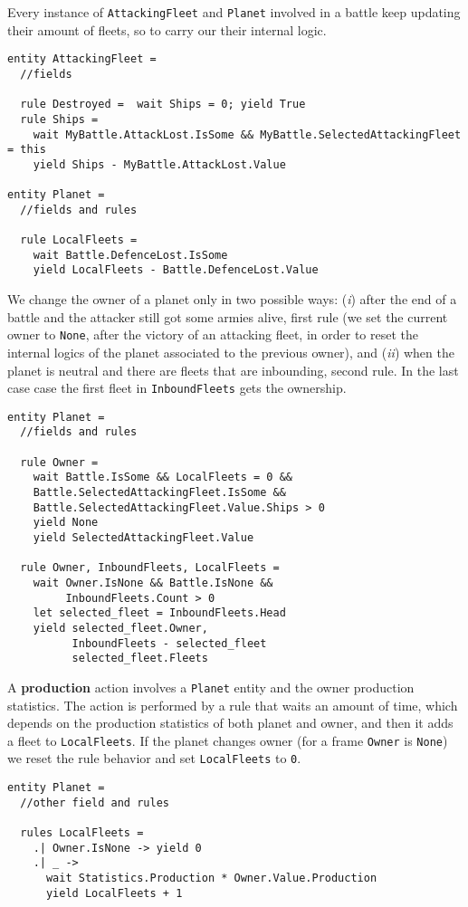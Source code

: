 \noindent
Every instance of \texttt{AttackingFleet} and \texttt{Planet} involved in a battle keep updating their amount of fleets, so to carry our their internal logic.
\begin{lstlisting}
entity AttackingFleet =
  //fields
  
  rule Destroyed =  wait Ships = 0; yield True
  rule Ships =
    wait MyBattle.AttackLost.IsSome && MyBattle.SelectedAttackingFleet = this
    yield Ships - MyBattle.AttackLost.Value
     
entity Planet =
  //fields and rules
  
  rule LocalFleets = 
    wait Battle.DefenceLost.IsSome
    yield LocalFleets - Battle.DefenceLost.Value
\end{lstlisting}

\noindent
We change the owner of a planet only in two possible ways: (\textit{i}) after the end of a battle and the attacker still got some armies alive, first rule (we set the current owner to \texttt{None}, after the victory of an attacking fleet, in order to reset the internal logics of the planet associated to the previous owner), and (\textit{ii}) when the planet is neutral and there are fleets that are inbounding, second rule. In the last case case the first fleet in \texttt{InboundFleets} gets the ownership.

\begin{lstlisting}
entity Planet =
  //fields and rules
  
  rule Owner = 
    wait Battle.IsSome && LocalFleets = 0 && 
    Battle.SelectedAttackingFleet.IsSome &&
    Battle.SelectedAttackingFleet.Value.Ships > 0
    yield None
    yield SelectedAttackingFleet.Value
    
  rule Owner, InboundFleets, LocalFleets = 
    wait Owner.IsNone && Battle.IsNone &&
         InboundFleets.Count > 0
    let selected_fleet = InboundFleets.Head
    yield selected_fleet.Owner,
          InboundFleets - selected_fleet 
          selected_fleet.Fleets
\end{lstlisting}

\noindent
A \textbf{production} action involves a \texttt{Planet} entity and the owner production statistics. The action is performed by a rule that waits an amount of time, which depends on the production statistics of both planet and owner, and then it adds a fleet to \texttt{LocalFleets}. If the planet changes owner (for a frame \texttt{Owner} is \texttt{None}) we reset the rule behavior and set \texttt{LocalFleets} to \texttt{0}.
\begin{lstlisting}
entity Planet =
  //other field and rules

  rules LocalFleets =
    .| Owner.IsNone -> yield 0
    .| _ ->
      wait Statistics.Production * Owner.Value.Production
      yield LocalFleets + 1
\end{lstlisting}

